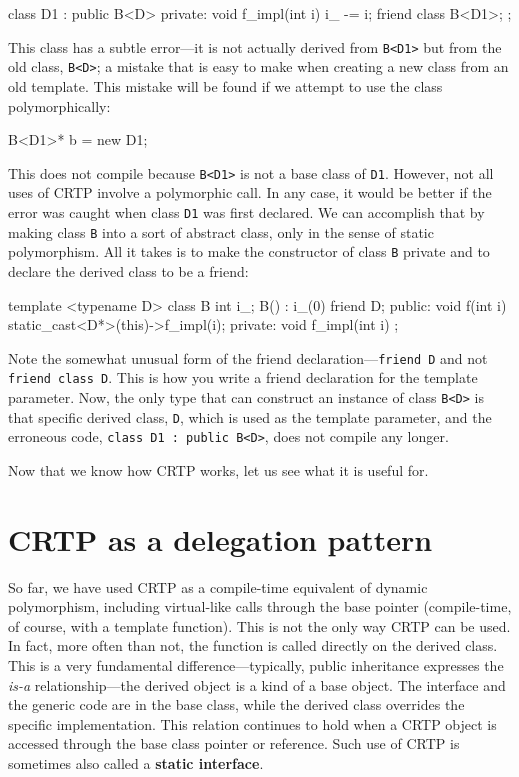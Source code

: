\begin{code}
class D1 : public B<D> {
  private:
  void f_impl(int i) { i_ -= i; }
  friend class B<D1>;
};
\end{code}

This class has a subtle error---it is not actually derived from \texttt{B\textless{}D1\textgreater{}} but from the old class, \texttt{B\textless{}D\textgreater{}}; a mistake that is easy to make when creating a new class from an old template. This mistake will be found if we attempt to use the class polymorphically:

\begin{code}
B<D1>* b = new D1;
\end{code}

This does not compile because \texttt{B\textless{}D1\textgreater{}} is not a base class of \texttt{D1}. However, not all uses of CRTP involve a polymorphic call. In any case, it would be better if the error was caught when class \texttt{D1} was first declared. We can accomplish that by making class \texttt{B} into a sort of abstract class, only in the sense of static polymorphism. All it takes is to make the constructor of class \texttt{B} private and to declare the derived class to be a friend:

\begin{code}
template <typename D> class B {
  int i_;
  B() : i_(0) {}
  friend D;
  public:
  void f(int i) { static_cast<D*>(this)->f_impl(i); }
  private:
  void f_impl(int i) {}
};
\end{code}

Note the somewhat unusual form of the friend declaration---\texttt{friend\ D} and not \texttt{friend\ class\ D}. This is how you write a friend declaration for the template parameter. Now, the only type that can construct an instance of class \texttt{B\textless{}D\textgreater{}} is that specific derived class, \texttt{D}, which is used as the template parameter, and the erroneous code, \texttt{class\ D1\ :\ public\ B\textless{}D\textgreater{}}, does not compile any longer.

Now that we know how CRTP works, let us see what it is useful for.

\section{CRTP as a delegation pattern}

So far, we have used CRTP as a compile-time equivalent of dynamic polymorphism, including virtual-like calls through the base pointer (compile-time, of course, with a template function). This is not the only way CRTP can be used. In fact, more often than not, the function is called directly on the derived class. This is a very fundamental difference---typically, public inheritance expresses the \emph{is-a} relationship---the derived object is a kind of a base object. The interface and the generic code are in the base class, while the derived class overrides the specific implementation. This relation continues to hold when a CRTP object is accessed through the base class pointer or reference. Such use of CRTP is sometimes also called a \textbf{static interface}.

